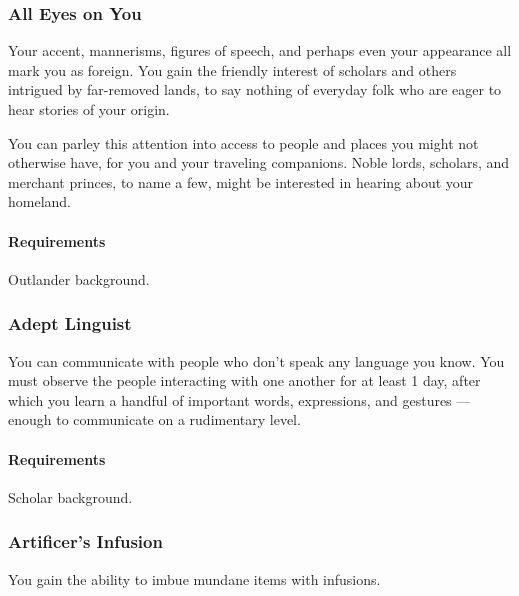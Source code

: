 
\subsubsection{All Eyes on You} \label{feat::alleyesonyou}
    Your accent, mannerisms, figures of speech, and perhaps even your appearance all mark you as foreign.
    You gain the friendly interest of scholars and others intrigued by far-removed lands, to say nothing of everyday folk who are eager to hear stories of your origin.

    You can parley this attention into access to people and places you might not otherwise have, for you and your traveling companions.
    Noble lords, scholars, and merchant princes, to name a few, might be interested in hearing about your homeland.
    \paragraph{Requirements} Outlander background.
\subsubsection{Adept Linguist} \label{feat::adeptlinguist}
    You can communicate with people who don't speak any language you know.
    You must observe the people interacting with one another for at least 1 day, after which you learn a handful of important words, expressions, and gestures --- enough to communicate on a rudimentary level.
    \paragraph{Requirements} Scholar background.
\subsubsection{Artificer's Infusion} \label{feat::artificersinfusion}
    You gain the ability to imbue mundane items with infusions.

